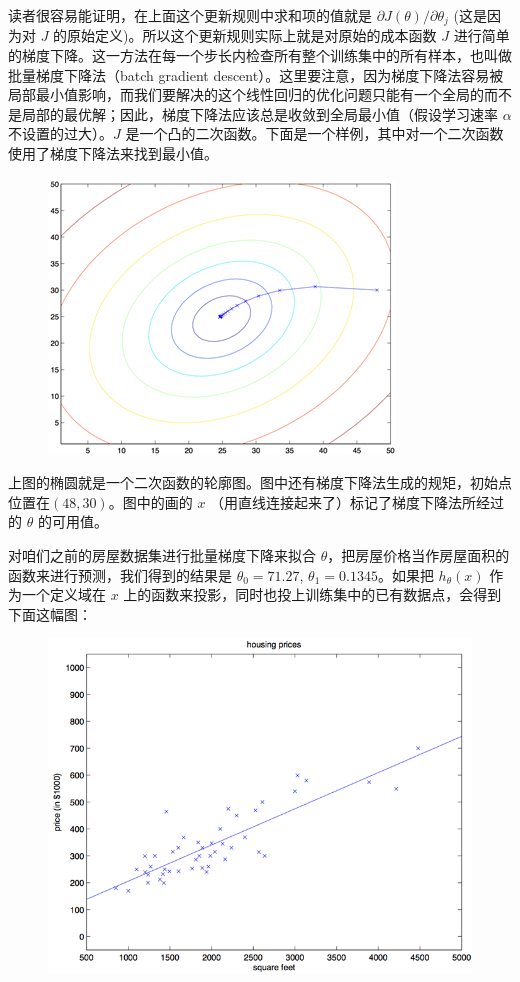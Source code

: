 \documentclass[UTF8]{ctexart}
\begin{document}
		读者很容易能证明，在上面这个更新规则中求和项的值就是 $ \partial J(\theta) / \partial \theta_{j} $ (这是因为对 $J$ 的原始定义)。所以这个更新规则实际上就是对原始的成本函数 $J$ 进行简单的梯度下降。这一方法在每一个步长内检查所有整个训练集中的所有样本，也叫做批量梯度下降法（batch gradient descent）。这里要注意，因为梯度下降法容易被局部最小值影响，而我们要解决的这个线性回归的优化问题只能有一个全局的而不是局部的最优解；因此，梯度下降法应该总是收敛到全局最小值（假设学习速率 $\alpha$ 不设置的过大）。$J$ 是一个凸的二次函数。下面是一个样例，其中对一个二次函数使用了梯度下降法来找到最小值。
		
		\begin{figure}[h]
			\centering
			\includegraphics{images/screenshot004}
		\end{figure}
		
		上图的椭圆就是一个二次函数的轮廓图。图中还有梯度下降法生成的规矩，初始点位置$在(48,30)$。图中的画的 $x$ （用直线连接起来了）标记了梯度下降法所经过的 $ \theta $ 的可用值。
		
		对咱们之前的房屋数据集进行批量梯度下降来拟合 $ \theta $，把房屋价格当作房屋面积的函数来进行预测，我们得到的结果是  $ \theta_{0} = 71.27 $,  $ \theta_{1} = 0.1345 $。如果把 $ h_{\theta}(x) $ 作为一个定义域在 $x$ 上的函数来投影，同时也投上训练集中的已有数据点，会得到下面这幅图：
		
		\begin{figure}[h]
			\centering
			\includegraphics{images/screenshot005}
		\end{figure}
		
\end{document}
